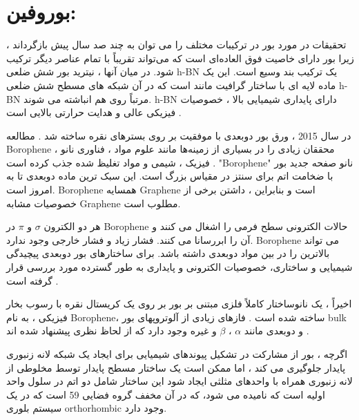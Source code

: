 \section{بوروفین:}
تحقیقات در مورد بور در ترکیبات مختلف را می توان به چند صد سال پیش بازگرداند ، زیرا بور دارای خاصیت فوق العاده‌ای است که می‌تواند تقریباً با تمام عناصر دیگر ترکیب شود. در میان آنها ، نیترید بور شش ضلعی \gls{h-BN} یک ترکیب بند وسیع  است. این یک ماده لایه ای با ساختار گرافیت مانند است که در آن شبکه های مسطح شش ضلعی \gls{h-BN} مرتباً روی هم انباشته می شوند. \gls{h-BN} دارای پایداری شیمیایی بالا ، خصوصیات فیزیکی عالی و هدایت حرارتی بالایی است \cite{golberg2010boron,ishii1981growth,nag2010graphene,wentorf1957cubic}.

در سال 2015 ، ورق بور دوبعدی با موفقیت بر روی بسترهای نقره   ساخته شد \cite{mannix2015synthesis}. مطالعه \gls{Borophene} محققان زیادی را در بسیاری از زمینه‌ها مانند علوم مواد ، فناوری نانو ، فیزیک ، شیمی و مواد تغلیظ شده جذب کرده است \cite{wang2019review,pekoz2018two,kulish2017surface}. "\gls{Borophene}" نانو صفحه جدید بور با ضخامت اتم برای سنتز در مقیاس بزرگ است. این سبک ترین ماده دوبعدی تا به امروز است. \gls{Borophene} همسایه \gls{Graphene} است و بنابراین ، داشتن برخی از خصوصیات مشابه \gls{Graphene} مطلوب است.

هر دو الکترون $\sigma$ و $\pi$ در \gls{Borophene} حالات الکترونی سطح فرمی را اشغال می کنند و آن را ابررسانا می کنند. فشار زیاد و فشار خارجی وجود ندارد. \gls{Borophene} می تواند بالاترین  را در بین مواد دوبعدی داشته باشد. برای ساختارهای بور دوبعدی پیچیدگی شیمیایی و ساختاری، خصوصیات الکترونی و پایداری به طور گسترده مورد بررسی قرار گرفته است \cite{kulish2017surface,zhao2016superconductivity,qin2018theoretical}.

اخیراً ، یک نانوساختار کاملاً فلزی مبتنی بر بور بر روی یک کریستال نقره با رسوب بخار فیزیکی ، به نام \gls{Borophene}، ساخته شده است \cite{mannix2015synthesis,feng2016experimental}. فازهای زیادی از آلوتروپهای بور \gls{bulk} و دوبعدی مانند $\alpha$ ، $\beta$ و غیره وجود دارد که از لحاظ نظری پیشنهاد شده اند \cite{lopez2016electronic,gonzalez2008boron}. 

اگرچه ، بور از مشارکت در تشکیل پیوندهای شیمیایی برای ایجاد یک شبکه لانه زنبوری پایدار جلوگیری می کند ، اما ممکن است یک ساختار مسطح پایدار توسط مخلوطی از لانه زنبوری همراه با واحدهای مثلثی ایجاد شود \cite{tang2007novel,tang2009self} این ساختار شامل دو اتم در سلول واحد اولیه است که  نامیده می شود، که در آن  مخفف گروه فضایی 59 است که در یک سیستم بلوری \gls{orthorhombic} وجود دارد.
